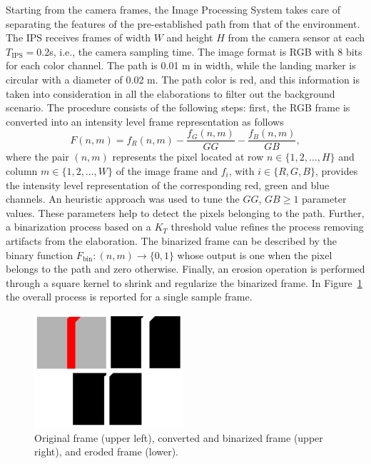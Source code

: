 \documentclass[a4paper,twocolumn,10pt]{article}
\begin{document}
    Starting from the camera frames, the Image Processing System takes care of separating the features of the 
    pre-established path from that of the environment.
    The IPS receives frames of width $W$ and height $H$ from the camera sensor at each   
    $T_\mathrm{IPS} = 0.2$s, i.e., the camera sampling time. The image format is RGB with 
    $8$ bits for each color channel. The path is 0.01 m in width, while the landing marker 
    is circular with a diameter of 0.02 m. The path color is red, and this information is 
    taken into consideration in all the elaborations to filter out the background scenario. The 
    procedure consists of the following steps: first, the RGB frame is converted into an intensity 
    level frame representation as follows 
    \begin{equation}
        F(n,m)=f_R(n,m) -  \frac{f_G(n,m)}{GG} - \frac{f_B(n,m)}{GB} ,
    \end{equation}
    where the pair $(n,m)$ represents the pixel located at row $n \in \{1, 2, \dots, H\}$ and column $m 
    \in \{1, 2, \dots, W\}$ of the image frame and $f_i$, with $i \in \{R, G, B\}$, provides the intensity level representation of the corresponding red, green and blue channels. An heuristic 
    approach was used to tune the $GG$, $GB \geq 1$ parameter values. These parameters help to detect the pixels belonging to the path. Further, a binarization process based on a $K_T$  threshold value refines the process removing artifacts from the elaboration. The binarized frame can be described by the binary 
    function $F_\mathrm{bin} \colon (n,m) \to \{0, 1\}$ whose output is one when the pixel belongs to the path and zero otherwise. Finally, an erosion operation is performed through a 
    square kernel to shrink and regularize the binarized frame. In Figure~\ref{fig:fig6frames} the overall process is reported for a single sample frame.

    \begin{figure}
        \centering
        \includegraphics[width=0.49\textwidth]{pics/fig6_track.jpg}
        \caption{Original frame (upper left),  converted and binarized frame (upper right), and eroded frame (lower).}
        \label{fig:fig6frames}
    \end{figure}
\end{document}
